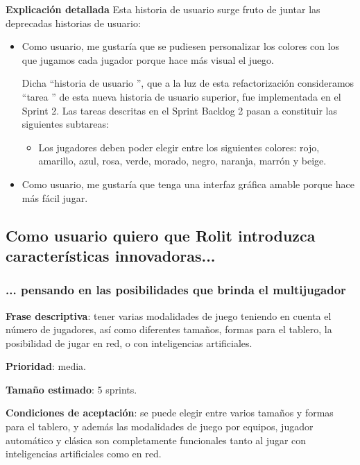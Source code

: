 \documentclass[../../FINAL/Scrum/SCRUM.tex]{subfiles}
\begin{document}
\textbf{Explicación detallada}
Esta historia de usuario surge fruto de juntar las deprecadas historias de usuario:
\begin{itemize}
\item  Como usuario, me gustaría que se pudiesen personalizar los colores con los que jugamos cada jugador porque hace más visual el juego. 

    Dicha  ``historia de usuario '', que a la luz de esta refactorización consideramos  ``tarea '' de esta nueva historia de usuario superior, fue implementada en el Sprint 2. Las tareas descritas en el Sprint Backlog 2 pasan a constituir las siguientes subtareas:
	\begin{itemize}
     \item Los jugadores deben poder elegir entre los siguientes colores: rojo, amarillo, azul, rosa, verde, morado, negro, naranja, marrón y beige.
     \end{itemize}

\item  Como usuario, me gustaría que tenga una interfaz gráfica amable porque hace más fácil jugar.
\end{itemize}

\subsection{Como usuario quiero que Rolit introduzca características innovadoras...}
\subsubsection{... pensando en las posibilidades que brinda el multijugador}
\textbf{Frase descriptiva}: tener varias modalidades de juego teniendo en cuenta el número de jugadores, así como diferentes tamaños, formas para el tablero, la posibilidad de jugar en red, o con inteligencias artificiales.

\textbf{Prioridad}: media.

\textbf{Tamaño estimado}: 5 sprints.

\textbf{Condiciones de aceptación}: se puede elegir entre varios tamaños y formas para el tablero, y además las modalidades de juego por equipos, jugador automático y clásica son completamente funcionales tanto al jugar con inteligencias artificiales como en red.
\end{document}
